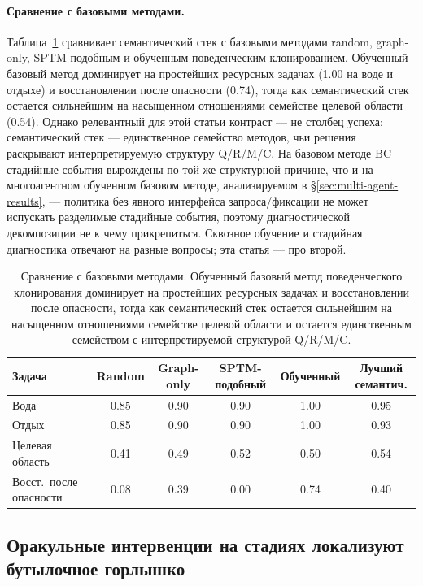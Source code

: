\documentclass{article}
\begin{document}
\paragraph{Сравнение с базовыми методами.}
Таблица~\ref{tab:baselines} сравнивает семантический стек с базовыми методами
random, graph-only, SPTM-подобным и обученным поведенческим клонированием.
Обученный базовый метод доминирует на простейших ресурсных задачах (1.00 на воде
и отдыхе) и восстановлении после опасности (0.74), тогда как семантический стек остается
сильнейшим на насыщенном отношениями семействе целевой области (0.54).
Однако релевантный для этой статьи контраст --- не столбец успеха:
семантический стек --- единственное семейство методов, чьи решения раскрывают
интерпретируемую структуру Q/R/M/C. На базовом методе BC стадийные события
вырождены по той же структурной причине, что и на многоагентном
обученном базовом методе, анализируемом в \S\ref{sec:multi-agent-results}, ---
политика без явного интерфейса запроса/фиксации не может испускать разделимые
стадийные события, поэтому диагностической декомпозиции не к чему
прикрепиться. Сквозное обучение и стадийная диагностика отвечают на разные
вопросы; эта статья --- про второй.

\begin{table}[t]
  \caption{Сравнение с базовыми методами. Обученный базовый метод поведенческого клонирования доминирует на простейших ресурсных задачах и восстановлении после опасности, тогда как семантический стек остается сильнейшим на насыщенном отношениями семействе целевой области и остается единственным семейством с интерпретируемой структурой Q/R/M/C.}
  \label{tab:baselines}
  \centering
  \small
  \begin{tabular}{p{1.9cm}c c c c c}
    \toprule
    Задача & Random & Graph-only & SPTM-подобный & Обученный & Лучший семантич. \\
    \midrule
    Вода & 0.85 & 0.90 & 0.90 & 1.00 & 0.95 \\
    Отдых & 0.85 & 0.90 & 0.90 & 1.00 & 0.93 \\
    Целевая область & 0.41 & 0.49 & 0.52 & 0.50 & 0.54 \\
    Восст.\ после опасности & 0.08 & 0.39 & 0.00 & 0.74 & 0.40 \\
    \bottomrule
  \end{tabular}
\end{table}

\subsection{Оракульные интервенции на стадиях локализуют бутылочное горлышко}
\label{sec:oracle}
\end{document}
